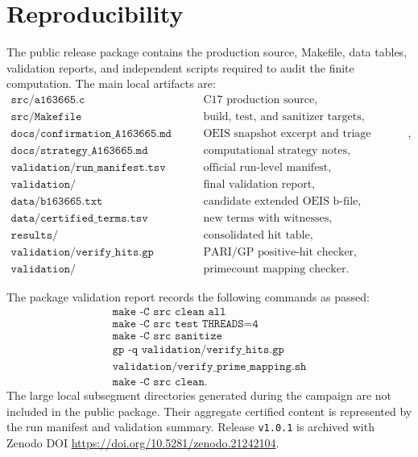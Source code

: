 \documentclass[11pt]{article}
\theoremstyle{definition}
\theoremstyle{remark}
\begin{document}
\section{Reproducibility}

The public release package contains the production source, Makefile,
data tables, validation reports, and independent scripts required to
audit the finite computation.  The main local artifacts are:
\[
\begin{array}{ll}
\texttt{src/a163665.c} & \text{C17 production source},\\
\texttt{src/Makefile} & \text{build, test, and sanitizer targets},\\
\texttt{docs/confirmation\_A163665.md} & \text{OEIS snapshot excerpt and triage confirmation},\\
\texttt{docs/strategy\_A163665.md} & \text{computational strategy notes},\\
\texttt{validation/run\_manifest.tsv} & \text{official run-level manifest},\\
\texttt{validation/validation\_summary.md} & \text{final validation report},\\
\texttt{data/b163665.txt} & \text{candidate extended OEIS b-file},\\
\texttt{data/certified\_terms.tsv} & \text{new terms with witnesses},\\
\texttt{results/A163665\_campaign\_hits.tsv} & \text{consolidated hit table},\\
\texttt{validation/verify\_hits.gp} & \text{PARI/GP positive-hit checker},\\
\texttt{validation/verify\_prime\_mapping.sh} & \text{primecount mapping checker}.
\end{array}
\]

The package validation report records the following commands as passed:
\[
\begin{array}{l}
\texttt{make -C src clean all}\\
\texttt{make -C src test THREADS=4}\\
\texttt{make -C src sanitize}\\
\texttt{gp -q validation/verify\_hits.gp}\\
\texttt{validation/verify\_prime\_mapping.sh}\\
\texttt{make -C src clean}.
\end{array}
\]
The large local subsegment directories generated during the campaign are
not included in the public package.  Their aggregate certified
content is represented by the run manifest and validation summary.
Release \texttt{v1.0.1} is archived with Zenodo DOI
\url{https://doi.org/10.5281/zenodo.21242104}.
\end{document}
